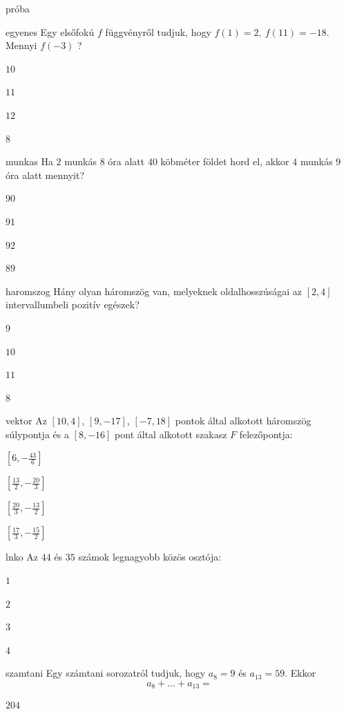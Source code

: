 \documentclass[12pt]{article}
\begin{document}
\begin{quiz}{próba}

\begin{multi}{egyenes}
Egy elsőfokú $f$ függvényről tudjuk, hogy $f(1)=2,\ f(11)=-18$. Mennyi $f(-3)$ ?
\item* $10$
\item  $11$
\item  $12$
\item  $8$
\end{multi}
\begin{multi}{munkas}
Ha $2$ munkás $8$ óra alatt $40$ köbméter földet hord el, akkor
$4$ munkás $9$ óra alatt mennyit? 

\item* $90$
\item  $91$
\item  $92$
\item  $89$
\end{multi}
\begin{multi}{haromszog}
Hány olyan háromszög van, melyeknek oldalhosszúságai az $[2,4]$ 
intervallumbeli pozitív egészek?
\item* $9$
\item  $10$
\item  $11$
\item  $8$
\end{multi}
\begin{multi}{vektor}
Az $\left[10, 4\right]$, $\left[9, -17\right]$, $\left[-7, 18\right]$ pontok által alkotott háromszög súlypontja és a $\left[8, -16\right]$ pont 
által alkotott szakasz $F$ felezőpontja:
\item* $\left[6, -\frac{43}{6}\right]$
\item  $\left[\frac{13}{2}, -\frac{20}{3}\right]$
\item  $\left[\frac{20}{3}, -\frac{13}{2}\right]$
\item  $\left[\frac{17}{3}, -\frac{15}{2}\right]$
\end{multi}
\begin{multi}{lnko}
Az $44$ és $35$ számok legnagyobb közös osztója:
\item* $1$
\item  $2$
\item  $3$
\item  $4$
\end{multi}
\begin{multi}{szamtani}
Egy számtani sorozatról tudjuk, hogy $a_{8}=9$ és $a_{13}=59$. Ekkor 
$$
a_{8}+\ldots +a_{13}=
$$
\item* $204$

\end{multi}
\end{quiz}
\end{document}

